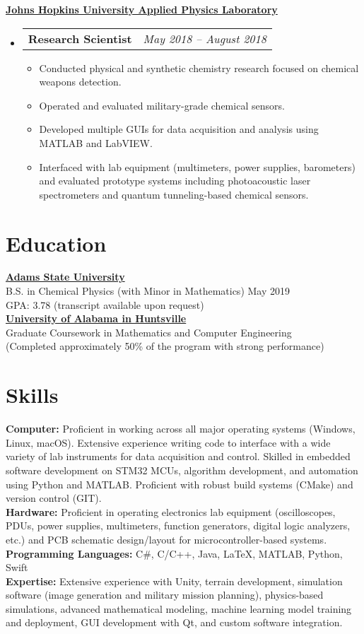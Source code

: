 \documentclass[letterpaper,11pt]{article}
\makeatletter
\newcommand{\resumeProjectEntry}[3]{%
    \vspace{-2pt}\item%
    \begin{tabular*}{0.97\textwidth}{l@{\extracolsep{\fill}}r}%
      \textbf{#1} \quad {\small \textcolor{blue}{#2}} & \textit{#3} \\%
    \end{tabular*}\vspace{-5pt}%
}
\newcommand{\resumeSubHeadingListStart}{\begin{itemize}[leftmargin=0.15in, label={}]}
\newcommand{\resumeSubHeadingListEnd}{\end{itemize}}
\newcommand{\setParameters}{%
	\vspace{-4pt}%
	\setlength{\itemsep}{0pt}%
	\setlength{\parskip}{0pt}%
}
\makeatother
\begin{document}
\underline{\textbf{Johns Hopkins University Applied Physics Laboratory}}\\[0.1cm]
\resumeSubHeadingListStart
\resumeProjectEntry{Research Scientist}{Intern}{May 2018 -- August 2018}
  \begin{itemize}
    \setParameters
    \item Conducted physical and synthetic chemistry research focused on chemical weapons detection.
    \item Operated and evaluated military-grade chemical sensors.
    \item Developed multiple GUIs for data acquisition and analysis using MATLAB and LabVIEW.
    \item Interfaced with lab equipment (multimeters, power supplies, barometers) and evaluated prototype systems including photoacoustic laser spectrometers and quantum tunneling-based chemical sensors.
  \end{itemize}
\resumeSubHeadingListEnd

\section{\hfill\Large{Education}}
\underline{\textbf{Adams State University}} \\
B.S. in Chemical Physics (with Minor in Mathematics) \hfill May 2019 \\
GPA: 3.78 (transcript available upon request) \\[5pt]
\underline{\textbf{University of Alabama in Huntsville}} \\
Graduate Coursework in Mathematics and Computer Engineering \\
(Completed approximately 50\% of the program with strong performance) \\[5pt]

\section{\hfill\Large{Skills}}
\textbf{Computer:} Proficient in working across all major operating systems (Windows, Linux, macOS). Extensive experience writing code to interface with a wide variety of lab instruments for data acquisition and control. Skilled in embedded software development on STM32 MCUs, algorithm development, and automation using Python and MATLAB. Proficient with robust build systems (CMake) and version control (GIT). \\[4pt]
\textbf{Hardware:} Proficient in operating electronics lab equipment (oscilloscopes, PDUs, power supplies, multimeters, function generators, digital logic analyzers, etc.) and PCB schematic design/layout for microcontroller-based systems. \\[4pt]
\textbf{Programming Languages:} C\#, C/C++, Java, LaTeX, MATLAB, Python, Swift \\[4pt]
\textbf{Expertise:} Extensive experience with Unity, terrain development, simulation software (image generation and military mission planning), physics-based simulations, advanced mathematical modeling, machine learning model training and deployment, GUI development with Qt, and custom software integration.
\end{document}
